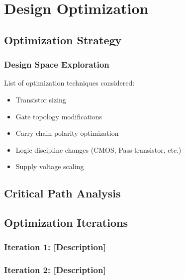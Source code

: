 \documentclass[12pt,letterpaper]{article}
\begin{document}
\section{Design Optimization}
\label{sec:optimization}


\subsection{Optimization Strategy}

\subsubsection{Design Space Exploration}

List of optimization techniques considered:
\begin{itemize}
    \item Transistor sizing
    \item Gate topology modifications
    \item Carry chain polarity optimization
    \item Logic discipline changes (CMOS, Pass-transistor, etc.)
    \item Supply voltage scaling
\end{itemize}

\subsection{Critical Path Analysis}


\subsection{Optimization Iterations}

\subsubsection{Iteration 1: [Description]}


\subsubsection{Iteration 2: [Description]}
\end{document}
